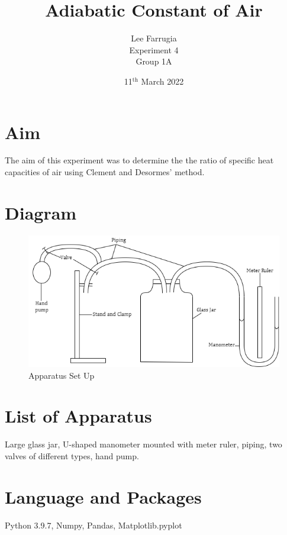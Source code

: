 \documentclass[12pt, a4paper]{article}
\title{Adiabatic Constant of Air}
\author{Lee Farrugia \\ Experiment 4 \\ Group 1A}
\date{11$^{\text{th}}$ March 2022}
\begin{document}
\maketitle
\thispagestyle{titlepagestyle}
\pagestyle{mystyle}

\section*{Aim}
The aim of this experiment was to determine the the ratio of specific heat capacities of air using Clement and Desormes' method.

\section*{Diagram}
\begin{figure}[H]
    \centering
    \includegraphics[width=\textwidth]{Experiment 4.png}
    \caption{Apparatus Set Up}
    \label{fig:set up}
\end{figure}

\section*{List of Apparatus}
Large glass jar, U-shaped manometer mounted with meter ruler, piping, two valves of different types, hand pump.

\section*{Language and Packages}
Python 3.9.7, Numpy, Pandas, Matplotlib.pyplot
\end{document}
